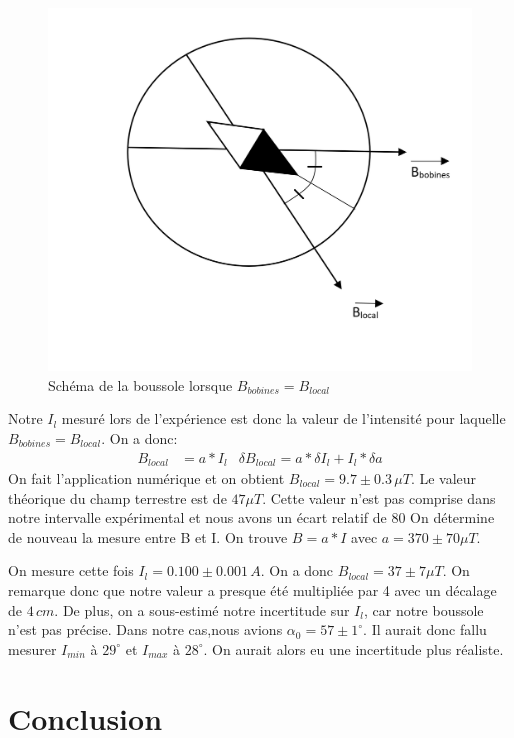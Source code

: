 \documentclass[12pt]{article}
\begin{document}
\begin{figure}[!h]
	\begin{center}
		\includegraphics[scale=0.5]{img/Boussole.png}
	\end{center}
	\label{SchmBouss}
	\caption{Schéma de la boussole lorsque $B_{bobines}=B_{local}$}
\end{figure}

Notre $I_l$ mesuré lors de l'expérience est donc la valeur de l'intensité pour laquelle $B_{bobines}=B_{local}$. On a donc:
\begin{align*}
B_{local}&=a*I_l & \delta B_{local}=a*\delta I_l + I_l * \delta a
\end{align*}
On fait l'application numérique et on obtient $B_{local}=9.7\pm 0.3\, \mu T$. Le valeur théorique du champ terrestre est de $47\mu T$. Cette valeur n'est pas comprise dans notre intervalle expérimental et nous avons un écart relatif de 80%
On détermine de nouveau la mesure entre B et I. On trouve $B=a*I$ avec $a=370\pm 70 \mu T$. 

On mesure cette fois $I_l=0.100\pm 0.001 \, A$. On a donc $B_{local}=37\pm 7 \mu T$. On remarque donc que notre valeur a presque été multipliée par 4 avec un décalage de $4\, cm$. De plus, on a sous-estimé notre incertitude sur $I_l$, car notre boussole n'est pas précise. Dans notre cas,nous avions $\alpha_0=57\pm 1^\circ$. Il aurait donc fallu mesurer $I_{min}$ à $29^\circ$ et $I_{max}$ à $28^\circ$. On aurait alors eu une incertitude plus réaliste. 

\section*{Conclusion}
\end{document}
